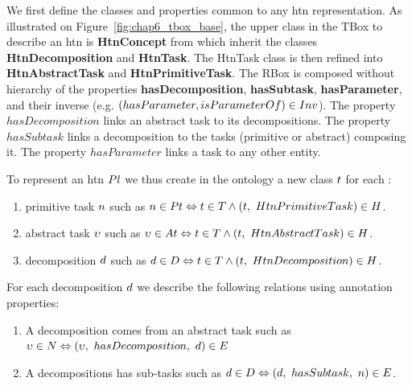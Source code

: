 We first define the classes and properties common to any \acrshort{htn} representation.
As illustrated on Figure~\ref{fig:chap6_tbox_base}, the upper class in the TBox to describe an \acrshort{htn} is \textbf{HtnConcept} from which inherit the classes \textbf{HtnDecomposition} and \textbf{HtnTask}. The HtnTask class is then refined into \textbf{HtnAbstractTask} and \textbf{HtnPrimitiveTask}.
The RBox is composed without hierarchy of the properties \textbf{hasDecomposition}, \textbf{hasSubtask}, \textbf{hasParameter}, and their inverse (e.g. $(hasParameter, isParameterOf) \in Inv$). The property $hasDecomposition$ links an abstract task to its decompositions. The property $hasSubtask$ links a decomposition to the tasks (primitive or abstract) composing it. The property $hasParameter$ links a task to any other entity.

To represent an \acrshort{htn} $Pl$ we thus create in the ontology a new class $t$ for each :
\begin{enumerate}
	\item primitive task $n$ such as 
$n \in Pt \Leftrightarrow t \in T \wedge (t,\ HtnPrimitiveTask) \in H$.
	\item abstract task $\upsilon$ such as $\upsilon \in At \Leftrightarrow t \in T \wedge (t,\ HtnAbstractTask) \in H$.
	\item decomposition $d$ such as $d \in D \Leftrightarrow t \in T \wedge (t,\ HtnDecomposition) \in H$.
\end{enumerate}

For each decomposition $d$ we describe the following relations using annotation properties:
\begin{enumerate}
	\item A decomposition comes from an abstract task such as $\upsilon \in N \Leftrightarrow (\upsilon,\ hasDecomposition,\ d) \in E$
	\item A decompositions has sub-tasks such as $d \in D \Leftrightarrow (d,\ hasSubtask,\ n) \in E$.
\end{enumerate}

